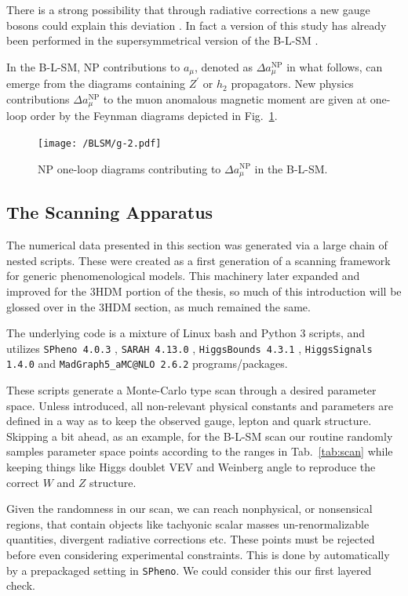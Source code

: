 \documentclass[10pt]{book}
\newcommand{\ro}[1]{\textrm{#1}}
\renewcommand{\(}{\left(}
\renewcommand{\)}{\right)}
\renewcommand{\[}{\left[}
\renewcommand{\]}{\right]}
\begin{document}
There is a strong possibility that through radiative corrections a new gauge bosons could explain this deviation \cite{Czarnecki:2001pv}. In fact a version of this study has already been performed in the supersymmetrical version of the B-L-SM \cite{Yang:2018guw}. 

In the B-L-SM, NP contributions to $a_\mu$, denoted as $\Delta a_\mu^{\textrm{NP}}$ in what follows, can emerge from the diagrams containing $Z^\prime$ or $h_2$ propagators. New physics contributions $\Delta a_\mu^{\ro{NP}}$ to the muon anomalous magnetic moment are given at one-loop order by the Feynman diagrams depicted in Fig.~\ref{fig:g-2}. 
\begin{figure}[H]
	\centering
	\texttt{[image: /BLSM/g-2.pdf]}
	\caption{NP one-loop diagrams contributing to $\Delta a_\mu^{\ro{NP}}$ in the B-L-SM.}
	\label{fig:g-2}
\end{figure}	


\subsection{The Scanning Apparatus}

The numerical data presented in this section was generated via a large chain of nested scripts. These were created as a first generation of a scanning framework for generic phenomenological models. This machinery later expanded and improved for the 3HDM portion of the thesis, so much of this introduction will be glossed over in the 3HDM section, as much remained the same. 

The underlying code is a mixture of Linux bash and Python 3 scripts, and utilizes \texttt{SPheno 4.0.3} \cite{Porod:2011nf},  \texttt{SARAH 4.13.0} \cite{Staub:2013tta}, \texttt{HiggsBounds 4.3.1} \cite{Bechtle:2013wla}, \texttt{HiggsSignals 1.4.0} \cite{Bechtle:2013xfa} and \texttt{MadGraph5\_aMC@NLO 2.6.2} \cite{Alwall:2014hca} programs/packages. 

These scripts generate a Monte-Carlo type scan through a desired parameter space. Unless introduced, all non-relevant physical constants and parameters are defined in a way as to keep the observed gauge, lepton and quark structure. { \color{gray} Skipping a bit ahead, as an example, for the B-L-SM scan our routine randomly samples parameter space points according to the ranges in Tab.~\ref{tab:scan} while keeping things like Higgs doublet VEV and Weinberg angle to reproduce the correct $W$ and $Z$ structure. } 

Given the randomness in our scan, we can reach nonphysical, or nonsensical regions, that contain objects like tachyonic scalar masses un-renormalizable quantities, divergent radiative corrections etc. 
%
These points must be rejected before even considering experimental constraints. This is done by automatically by a prepackaged setting in \texttt{SPheno}. 
%
We could consider this our first layered check. 
\end{document}
